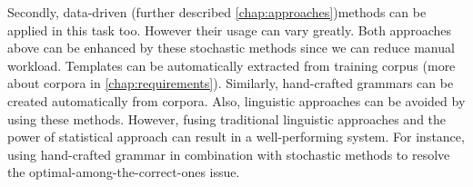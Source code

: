 Secondly, data-driven (further described \autoref{chap:approaches})methods can be applied in this task too. However their usage can vary greatly. Both approaches above can be enhanced by these stochastic methods since we can reduce manual workload. Templates can be automatically extracted from training corpus (more about corpora in \autoref{chap:requirements}). Similarly, hand-crafted grammars can be created automatically from corpora. Also, linguistic approaches can be avoided by using these methods. However, fusing traditional linguistic approaches and the power of statistical approach can result in a well-performing system. For instance, using hand-crafted grammar in combination with stochastic methods to resolve the optimal-among-the-correct-ones issue.



